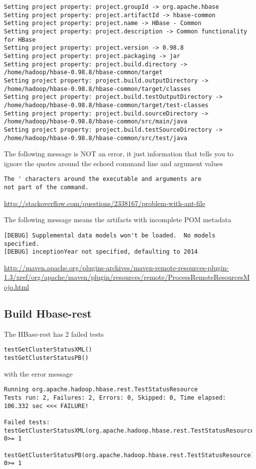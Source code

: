 \begin{verbatim}
Setting project property: project.groupId -> org.apache.hbase
Setting project property: project.artifactId -> hbase-common
Setting project property: project.name -> HBase - Common
Setting project property: project.description -> Common functionality for HBase
Setting project property: project.version -> 0.98.8
Setting project property: project.packaging -> jar
Setting project property: project.build.directory -> /home/hadoop/hbase-0.98.8/hbase-common/target
Setting project property: project.build.outputDirectory -> /home/hadoop/hbase-0.98.8/hbase-common/target/classes
Setting project property: project.build.testOutputDirectory -> /home/hadoop/hbase-0.98.8/hbase-common/target/test-classes
Setting project property: project.build.sourceDirectory -> /home/hadoop/hbase-0.98.8/hbase-common/src/main/java
Setting project property: project.build.testSourceDirectory -> /home/hadoop/hbase-0.98.8/hbase-common/src/test/java

\end{verbatim}

The following message is NOT an error, it just information that tells you to
ignore the quotes around the echoed command line and argument values
\begin{verbatim}
The ' characters around the executable and arguments are
not part of the command.
\end{verbatim}
\url{http://stackoverflow.com/questions/2338167/problem-with-ant-file}

The following message means the artifacts with incomplete POM metadata
\begin{verbatim}
[DEBUG] Supplemental data models won't be loaded.  No models specified.
[DEBUG] inceptionYear not specified, defaulting to 2014
\end{verbatim}
\url{http://maven.apache.org/plugins-archives/maven-remote-resources-plugin-1.3/xref/org/apache/maven/plugin/resources/remote/ProcessRemoteResourcesMojo.html}

\subsection{Build Hbase-rest}
\label{sec:Hbase-rest-test}

The HBase-rest has 2 failed tests
\begin{verbatim}
testGetClusterStatusXML()
testGetClusterStatusPB()
\end{verbatim}
with the error message
\begin{verbatim}
Running org.apache.hadoop.hbase.rest.TestStatusResource
Tests run: 2, Failures: 2, Errors: 0, Skipped: 0, Time elapsed: 106.332 sec <<< FAILURE!

Failed tests:   testGetClusterStatusXML(org.apache.hadoop.hbase.rest.TestStatusResource): 0>= 1
  testGetClusterStatusPB(org.apache.hadoop.hbase.rest.TestStatusResource): 0>= 1

\end{verbatim}


